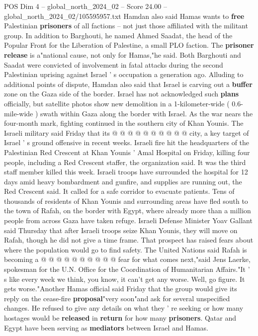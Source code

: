 \begin{textsample}{POS Dim 4 – global\_north\_2024\_02 – Score 24.00 – global\_north\_2024\_02/105595957.txt}
Hamdan also said Hamas wants to \textbf{free} Palestinian \textbf{prisoners} of all factions -- not just those affiliated with the militant group.
In addition to Barghouti, he named Ahmed Saadat, the head of the Popular Front for the Liberation of Palestine, a small PLO faction.
The \textbf{prisoner} \textbf{release} is a"national cause, not only for Hamas,"he said.
Both Barghouti and Saadat were convicted of involvement in fatal attacks during the second Palestinian uprising against Israel ' s occupation a generation ago.
Alluding to additional points of dispute, Hamdan also said that Israel is carving out a \textbf{buffer} zone on the Gaza side of the border.
Israel has not acknowledged such \textbf{plans} officially, but satellite photos show new demolition in a 1-kilometer-wide ( 0.6-mile-wide ) swath within Gaza along the border with Israel.
As the war nears the four-month mark, fighting continued in the southern city of Khan Younis.
The Israeli military said Friday that its @ @ @ @ @ @ @ @ @ @ city, a key target of Israel ' s ground offensive in recent weeks.
Israeli fire hit the headquarters of the Palestinian Red Crescent at Khan Younis ' Amal Hospital on Friday, killing four people, including a Red Crescent staffer, the organization said.
It was the third staff member killed this week.
Israeli troops have surrounded the hospital for 12 days amid heavy bombardment and gunfire, and supplies are running out, the Red Crescent said.
It called for a safe corridor to evacuate patients.
Tens of thousands of residents of Khan Younis and surrounding areas have fled south to the town of Rafah, on the border with Egypt, where already more than a million people from across Gaza have taken refuge.
Israeli Defense Minister Yoav Gallant said Thursday that after Israeli troops seize Khan Younis, they will move on Rafah, though he did not give a time frame.
That prospect has raised fears about where the population would go to find safety.
The United Nations said Rafah is becoming a @ @ @ @ @ @ @ @ @ @ fear for what comes next,"said Jens Laerke, spokesman for the U.N.
Office for the Coordination of Humanitarian Affairs."It ' s like every week we think, you know, it can't get any worse.
Well, go figure.
It gets worse."Another Hamas official said Friday that the group would give its reply on the cease-fire \textbf{proposal}"very soon"and ask for several unspecified changes.
He refused to give any details on what they ' re seeking or how many hostages would be \textbf{released} in \textbf{return} for how many \textbf{prisoners}.
Qatar and Egypt have been serving as \textbf{mediators} between Israel and Hamas.

\end{textsample}
